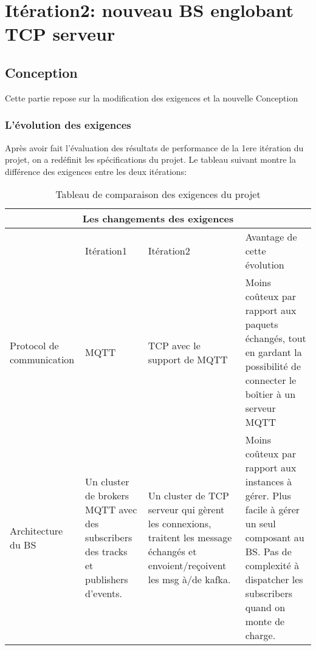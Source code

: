 \section{Itération2: nouveau BS englobant TCP serveur}
    \subsection{Conception}
    Cette partie repose sur la modification des exigences et la nouvelle Conception
        \subsubsection{L'évolution des exigences}
            Après avoir fait l’évaluation des résultats de performance 
            de la 1ere itération du projet, on a redéfinit les spécifications du projet. 
            Le tableau suivant montre la différence des exigences entre les deux itérations:
            \\
            \begin{table}[h!]
            \centering
            \begin{tabular}{|p{3cm}|p{3cm}|p{4cm}|p{5cm}|}
                \hline
                \multicolumn{4}{|c|}{Les changements des exigences } \\
                \hline   & Itération1 & Itération2 & Avantage de cette évolution\\
                \hline
                Protocol de communication & MQTT & TCP avec le support de MQTT &
                Moins coûteux par rapport aux paquets échangés, tout en gardant 
                la possibilité de connecter le boîtier à un serveur MQTT \\
                \hline
                Architecture du BS  &  Un cluster de brokers MQTT avec des 
                subscribers des tracks et publishers d’events.  & Un cluster de 
                TCP serveur qui gèrent les connexions, traitent les message échangés 
                et envoient/re\c coivent les msg à/de kafka. & Moins coûteux par 
                rapport aux instances à gérer. 
                Plus facile à gérer un seul composant au BS. 
                Pas de complexité à dispatcher les subscribers quand on monte de charge.\\
                \hline 
            \end{tabular}
            \caption{Tableau de comparaison des exigences du projet}
            \label{table:1}
        \end{table} \\
    
